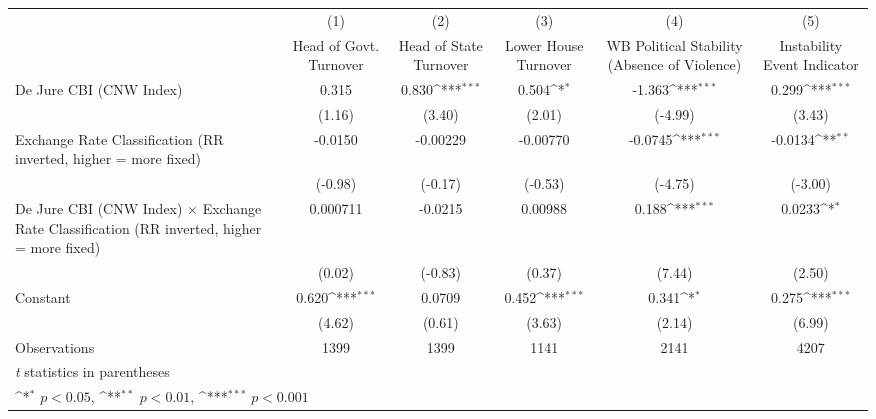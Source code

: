 {
\def\sym#1{\ifmmode^{#1}\else\(^{#1}\)\fi}
\begin{tabular}{l*{5}{c}}
\hline\hline
                &\multicolumn{1}{c}{(1)}&\multicolumn{1}{c}{(2)}&\multicolumn{1}{c}{(3)}&\multicolumn{1}{c}{(4)}&\multicolumn{1}{c}{(5)}\\
                &\multicolumn{1}{c}{Head of Govt. Turnover}&\multicolumn{1}{c}{Head of State Turnover}&\multicolumn{1}{c}{Lower House Turnover}&\multicolumn{1}{c}{WB Political Stability (Absence of Violence)}&\multicolumn{1}{c}{Instability Event Indicator}\\
\hline
De Jure CBI (CNW Index)&    0.315         &    0.830\sym{***}&    0.504\sym{*}  &   -1.363\sym{***}&    0.299\sym{***}\\
                &   (1.16)         &   (3.40)         &   (2.01)         &  (-4.99)         &   (3.43)         \\
[1em]
Exchange Rate Classification (RR inverted, higher = more fixed)&  -0.0150         & -0.00229         & -0.00770         &  -0.0745\sym{***}&  -0.0134\sym{**} \\
                &  (-0.98)         &  (-0.17)         &  (-0.53)         &  (-4.75)         &  (-3.00)         \\
[1em]
De Jure CBI (CNW Index) $\times$ Exchange Rate Classification (RR inverted, higher = more fixed)& 0.000711         &  -0.0215         &  0.00988         &    0.188\sym{***}&   0.0233\sym{*}  \\
                &   (0.02)         &  (-0.83)         &   (0.37)         &   (7.44)         &   (2.50)         \\
[1em]
Constant        &    0.620\sym{***}&   0.0709         &    0.452\sym{***}&    0.341\sym{*}  &    0.275\sym{***}\\
                &   (4.62)         &   (0.61)         &   (3.63)         &   (2.14)         &   (6.99)         \\
\hline
Observations    &     1399         &     1399         &     1141         &     2141         &     4207         \\
\hline\hline
\multicolumn{6}{l}{\footnotesize \textit{t} statistics in parentheses}\\
\multicolumn{6}{l}{\footnotesize \sym{*} \(p<0.05\), \sym{**} \(p<0.01\), \sym{***} \(p<0.001\)}\\
\end{tabular}
}
